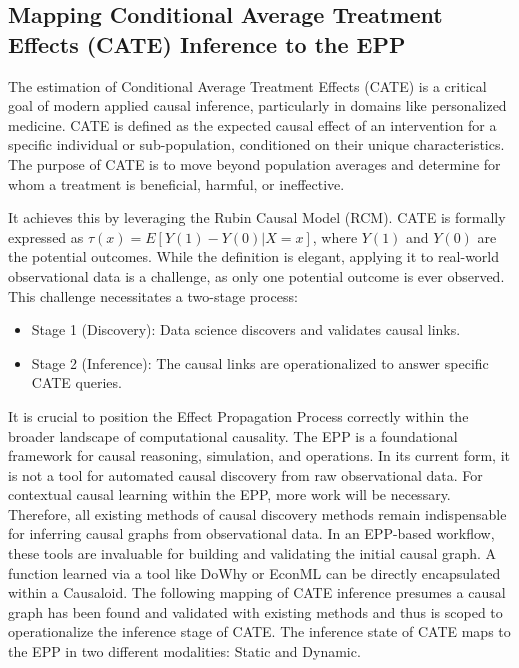 %
%
\subsection{Mapping Conditional Average Treatment Effects (CATE) Inference to the EPP}
\label{sec:epp_cate}

The estimation of Conditional Average Treatment Effects (CATE) is a critical goal of modern applied causal inference, particularly in domains like personalized medicine. CATE is defined as the expected causal effect of an intervention for a specific individual or sub-population, conditioned on their unique characteristics. The purpose of CATE is to move beyond population averages and determine for whom a treatment is beneficial, harmful, or ineffective.

It achieves this by leveraging the Rubin Causal Model (RCM). CATE is formally expressed as $\tau(x) = E[Y(1) - Y(0) | X=x]$, where $Y(1)$ and $Y(0)$ are the potential outcomes. While the definition is elegant, applying it to real-world observational data is a challenge, as only one potential outcome is ever observed. This challenge necessitates a two-stage process:
\begin{itemize}
	\item Stage 1 (Discovery): Data science discovers and validates causal links.
	\item Stage 2 (Inference): The causal links are operationalized to answer specific CATE queries. 
\end{itemize} 

It is crucial to position the Effect Propagation Process correctly within the broader landscape of computational causality. The EPP is a foundational framework for causal reasoning, simulation, and operations. In its current form, it is not a tool for automated causal discovery from raw observational data. For contextual causal learning within the EPP, more work will be necessary. Therefore, all existing methods of causal discovery methods remain indispensable for inferring causal graphs from observational data. In an EPP-based workflow, these tools are invaluable for building and validating the initial causal graph. A function learned via a tool like DoWhy or EconML can be directly encapsulated within a Causaloid. The following mapping of CATE inference presumes a causal graph has been found and validated with existing methods and thus is scoped to operationalize the inference stage of CATE. The inference state of CATE maps to the EPP in two different modalities: Static and Dynamic.


